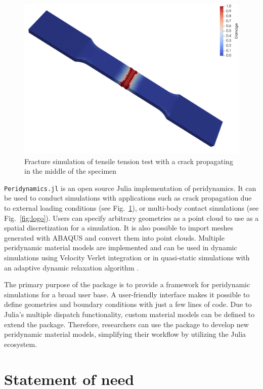 \documentclass{juliacon}
\begin{document}
\begin{figure}
\centerline{\includegraphics[width=0.8\linewidth]{tensile_test.png}}
\caption{Fracture simulation of tensile tension test with a crack propagating in the middle of the specimen}
\label{fig:tensiletest}
\end{figure}

\texttt{Peridynamics.jl} is an open source Julia \cite{Bezanson2017julia} implementation of peridynamics.
It can be used to conduct simulations with applications such as crack propagation due to external loading conditions (see Fig.~\ref{fig:tensiletest}), or multi-body contact simulations (see Fig.~\ref{fig:logo}).
Users can specify arbitrary geometries as a point cloud to use as a spatial discretization for a simulation.
It is also possible to import meshes generated with ABAQUS and convert them into point clouds.
Multiple peridynamic material models are implemented and can be used in dynamic simulations using Velocity Verlet integration or in quasi-static simulations with an adaptive dynamic relaxation algorithm \cite{Kilic2010}.

The primary purpose of the package is to provide a framework for peridynamic simulations for a broad user base.
A user-friendly interface makes it possible to define geometries and boundary conditions with just a few lines of code.
Due to Julia's multiple dispatch functionality, custom material models can be defined to extend the package.
Therefore, researchers can use the package to develop new peridynamic material models, simplifying their workflow by utilizing the Julia ecosystem.

\section{Statement of need}
\end{document}
